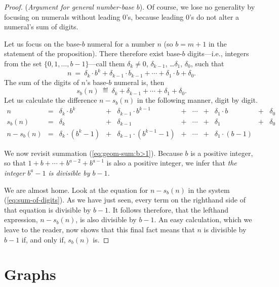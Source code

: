 \begin{proof}
({\it Argument for general number-base $b$}).
%
Of course, we lose no generality by focusing on numerals without
leading $0$'s, because leading $0$'s do not alter a numeral's sum of
digits.

Let us focus on the base-$b$ numeral for a number $n$ (so $b = m+1$ in
the statement of the proposition).  There therefore exist base-$b$
digits---i.e., integers from the set $\{0, 1, \ldots, b-1\}$---call
them $\delta_k \neq 0$, $\delta_{k-1}$, \ldots $\delta_1$, $\delta_0$,
such that
\[ n \ = \ \delta_k \cdot b^k + \delta_{k-1} \cdot b_{k-1} + \cdots +
\delta_1 \cdot b + \delta_0. \]
The sum of the digits of $n$'s base-$b$ numeral is, then
\[ s_b(n) \ \eqdef \ \delta_k + \delta_{k-1} + \cdots + \delta_1 +
\delta_0. \]
Let us calculate the difference $n - s_b(n)$ in the following manner,
digit by digit.
\begin{equation}
\label{eq:sum-of-digits}
\begin{array}{ccccccccccc}
n & = &
\delta_k \cdot b^k & + & \delta_{k-1} \cdot b^{k-1} & + & \cdots
  & + & \delta_1 \cdot b & + & \delta_0 \\
s_b(n) & = &
\delta_k & + & \delta_{k-1} & + & \cdots & + & \delta_1 & + & \delta_0 \\
\hline
n - s_b(n) & = &
\delta_k \cdot (b^k -1) & + &
\delta_{k-1} \cdot (b^{k-1} -1) & + &
\cdots & + &
\delta_1 \cdot (b-1) & & 
\end{array}
\end{equation}

\medskip

We now revisit summation (\ref{eq:geom-sum:b>1}).  Because $b$ is a
positive integer, so that $1 + b + \cdots + b^{a-2} + b^{a-1}$ is also
a positive integer, we infer that {\em the integer $b^a -1$ is
  divisible by $b-1$.}

We are almost home.  Look at the equation for $n - s_b(n)$ in the
system (\ref{eq:sum-of-digits}).  As we have just seen, every term on
the righthand side of that equation is divisible by $b-1$.  It follows
therefore, that the lefthand expression, $n - s_b(n)$, is also
divisible by $b-1$.
An easy calculation, which we leave to the reader, now shows that this
final fact means that $n$ is divisible by $b-1$ if, and only if,
$s_b(n)$ is.
\end{proof}

\section{Graphs}

